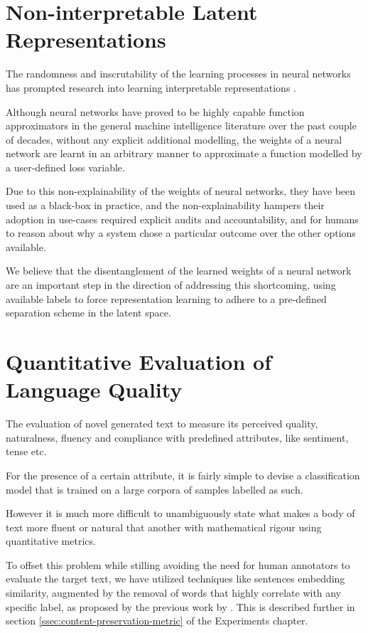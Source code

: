 
\section{Non-interpretable Latent Representations}

The randomness and inscrutability of the learning processes in neural networks has prompted research into learning interpretable representations \citep{chen2016infogan}.

Although neural networks have proved to be highly capable function approximators in the general machine intelligence literature over the past couple of decades, without any explicit additional modelling, the weights of a neural network are learnt in an arbitrary manner to approximate a function modelled by a user-defined loss variable.

Due to this non-explainability of the weights of neural networks, they have been used as a black-box in practice, and the non-explainability hampers their adoption in use-cases required explicit audits and accountability, and for humans to reason about why a system chose a particular outcome over the other options available.

We believe that the disentanglement of the learned weights of a neural network are an important step in the direction of addressing this shortcoming, using available labels to force representation learning to adhere to a pre-defined separation scheme in the latent space.


\section{Quantitative Evaluation of Language Quality}

The evaluation of novel generated text to measure its perceived quality, naturalness, fluency and compliance with predefined attributes, like sentiment, tense etc.

For the presence of a certain attribute, it is fairly simple to devise a classification model that is trained on a large corpora of samples labelled as such.

However it is much more difficult to unambiguously state what makes a body of text more fluent or natural that another with mathematical rigour using quantitative metrics.

To offset this problem while stilling avoiding the need for human annotators to evaluate the target text, we have utilized techniques like sentences embedding similarity, augmented by the removal of words that highly correlate with any specific label, as proposed by the previous work by \cite{fu2017style}. This is described further in section \ref{ssec:content-preservation-metric} of the Experiments chapter.

